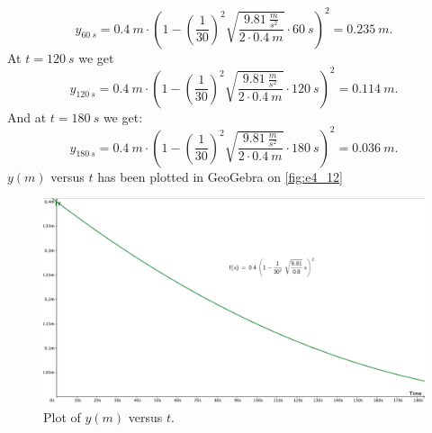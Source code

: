 \[ 
  y_{\qty{60}{s}} = \qty{0,4}{m} \cdot \left( 1 - \left( \frac{1}{30} \right)^2 \sqrt{\frac{\qty{9,81}{\frac{m}{s^2}}}{2 \cdot \qty{0,4}{m}}} \cdot \qty{60}{s}  \right)^2 = \qty{0.235}{m}
.\]
At $t = \qty{120}{s}$ we get
\[ 
y_{\qty{120}{s}} = \qty{0,4}{m} \cdot \left( 1 - \left( \frac{1}{30} \right)^2 \sqrt{\frac{\qty{9,81}{\frac{m}{s^2}}}{2 \cdot \qty{0,4}{m}}} \cdot \qty{120}{s}  \right)^2 = \qty{0,114}{m}
.\]
And at $t = \qty{180}{s}$ we get:
\[ 
y_{\qty{180}{s}} = \qty{0,4}{m} \cdot \left( 1 - \left( \frac{1}{30} \right)^2 \sqrt{\frac{\qty{9,81}{\frac{m}{s^2}}}{2 \cdot \qty{0,4}{m}}} \cdot \qty{180}{s}  \right)^2 = \qty{0,036}{m}
.\]
$y(m)$ versus $t$ has been plotted in GeoGebra on \autoref{fig:e4_12}

\begin{figure} [ht]
  \centering
  \includegraphics[width=0.8\linewidth]{./figures/e4_12.png}
  \caption{Plot of $y(m)$ versus $t$.}
  \label{fig:e4_12}
\end{figure}
